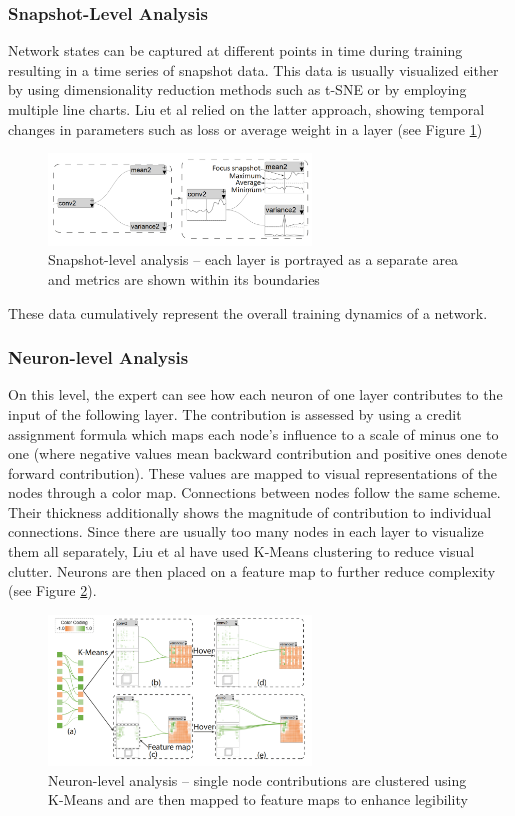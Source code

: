 \documentclass{acmsiggraph}               %
\begin{document}
\subsubsection{Snapshot-Level Analysis}
Network states can be captured at different points in time during training resulting in a time series of snapshot data.
This data is usually visualized either by using dimensionality reduction methods such as t-SNE or by employing multiple line charts. 
Liu et al relied on the latter approach, showing temporal changes in parameters such as loss or average weight in a layer (see Figure \ref{fig:mengchen2})

\begin{figure}[!htb]
  \centering
  \includegraphics[width=2.75in]{mengchen2}
  \caption{Snapshot-level analysis -- each layer is portrayed as a separate area and metrics are shown within its boundaries \protect\cite{Liu2018}}
  \label{fig:mengchen2}
\end{figure}

These data cumulatively represent the overall training dynamics of a network.

\subsubsection{Neuron-level Analysis}
On this level, the expert can see how each neuron of one layer contributes to the input of the following layer. The contribution is assessed by using a credit assignment formula which maps each node's influence to a scale of minus one to one (where negative values mean backward contribution and positive ones denote forward contribution).
These values are mapped to visual representations of the nodes through a color map. Connections between nodes follow the same scheme. Their thickness additionally shows the magnitude of contribution to individual connections. Since there are usually too many nodes in each layer to visualize them all separately, Liu et al have used K-Means clustering to reduce visual clutter. Neurons are then placed on a feature map to further reduce complexity (see Figure \ref{fig:mengchen3}).

\begin{figure}[!htb]
  \centering
  \includegraphics[width=2.75in]{mengchen3}
  \caption{Neuron-level analysis -- single node contributions are clustered using K-Means and are then mapped to feature maps to enhance legibility \protect\cite{Liu2018}}
  \label{fig:mengchen3}
\end{figure}
\end{document}
